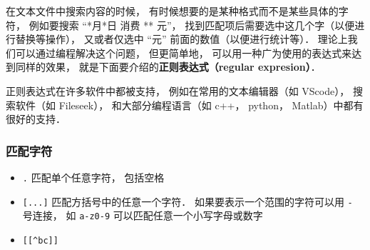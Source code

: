 

在文本文件中搜索内容的时候， 有时候想要的是某种格式而不是某些具体的字符， 例如要搜索 “*月*日 消费 ** 元”， 找到匹配项后需要选中这几个字（以便进行替换等操作）， 又或者仅选中 “元” 前面的数值（以便进行统计等）． 理论上我们可以通过编程解决这个问题， 但更简单地， 可以用一种广为使用的表达式来达到同样的效果， 就是下面要介绍的\textbf{正则表达式（regular expresion）}．

正则表达式在许多软件中都被支持， 例如在常用的文本编辑器（如 VScode）， 搜索软件（如 Fileseek）， 和大部分编程语言（如 c++， python， Matlab）中都有很好的支持．

\subsubsection{匹配字符}
\begin{itemize}
\item \verb|.| 匹配单个任意字符， 包括空格
\item \verb|[...]| 匹配方括号中的任意一个字符． 如果要表示一个范围的字符可以用 \verb|-| 号连接， 如 \verb|a-z0-9| 可以匹配任意一个小写字母或数字
\item \verb|[[^bc]]|
\end{itemize}


